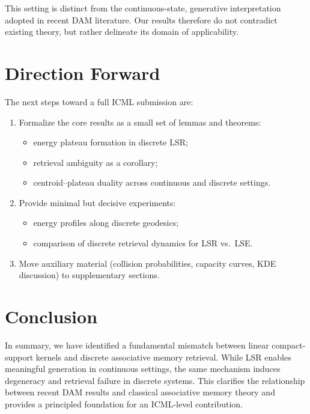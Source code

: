 \documentclass[11pt,a4paper]{article}
\begin{document}
This setting is distinct from the continuous-state, generative interpretation adopted in recent DAM literature. Our results therefore do not contradict existing theory, but rather delineate its domain of applicability.

\section{Direction Forward}

The next steps toward a full ICML submission are:
\begin{enumerate}
    \item Formalize the core results as a small set of lemmas and theorems:
    \begin{itemize}
        \item energy plateau formation in discrete LSR;
        \item retrieval ambiguity as a corollary;
        \item centroid--plateau duality across continuous and discrete settings.
    \end{itemize}
    \item Provide minimal but decisive experiments:
    \begin{itemize}
        \item energy profiles along discrete geodesics;
        \item comparison of discrete retrieval dynamics for LSR vs.\ LSE.
    \end{itemize}
    \item Move auxiliary material (collision probabilities, capacity curves, KDE discussion) to supplementary sections.
\end{enumerate}

\section*{Conclusion}

In summary, we have identified a fundamental mismatch between linear compact-support kernels and discrete associative memory retrieval. While LSR enables meaningful generation in continuous settings, the same mechanism induces degeneracy and retrieval failure in discrete systems. This clarifies the relationship between recent DAM results and classical associative memory theory and provides a principled foundation for an ICML-level contribution.
\end{document}
